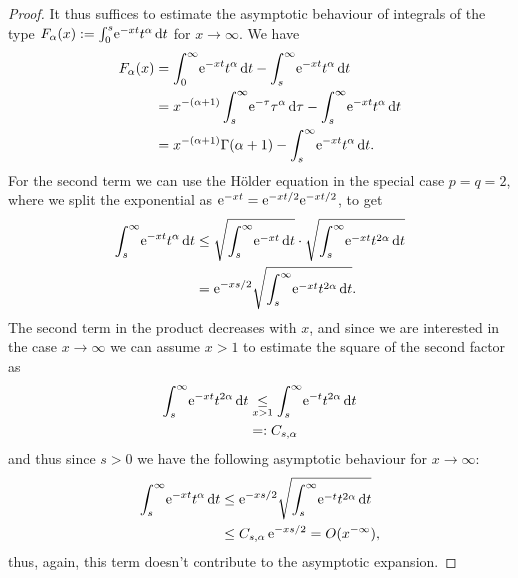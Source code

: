 \begin{theorem}
\begin{proof}
        It thus suffices to estimate the asymptotic behaviour of integrals of
        the type $F_\alpha(x) := \Integ[s]0t{\Eto{-xt}t^\alpha}$ for
        $x\to\infty$. We have
        \begin{align*}
            F_\alpha(x) &= \Integ[\infty]{0}{t}{\Eto{-xt}t^\alpha} -
            \Integ[\infty]{s}{t}{\Eto{-xt}t^\alpha} \\
            &= x^{-(\alpha+1)}\Integ[\infty]{s}{\tau}{\Eto{-\tau}\tau^\alpha} -
            \Integ[\infty]{s}{t}{\Eto{-xt}t^\alpha} \\
            &= x^{-(\alpha+1)}\Gamma(\alpha + 1) - 
            \Integ[\infty]{s}{t}{\Eto{-xt}t^\alpha}.
        \end{align*}
        For the second term we can use the Hölder equation in the special case
        $p=q=2$, where we split the exponential as $\Eto{-xt} =
        \Eto{-xt/2}\Eto{-xt/2}$, to get
        \begin{align*}
            \Integ[\infty]{s}{t}{\Eto{-xt}t^\alpha} &\le
            \sqrt{\Integ[\infty]{s}{t}{\Eto{-xt}}} \cdot
            \sqrt{\Integ[\infty]{s}{t}{\Eto{-xt}t^{2\alpha}}} \\
            &= \Eto{-xs/2} \sqrt{\Integ[\infty]{s}{t}{\Eto{-xt}t^{2\alpha}}}.
        \end{align*}
        The second term in the product decreases with $x$, and since we are
        interested in the case $x\to\infty$ we can assume $x>1$ to estimate the
        square of the second factor as
        \begin{align*}
            \Integ[\infty]{s}{t}{\Eto{-xt}t^{2\alpha}} &\underset{x>1}\le
            \Integ[\infty]{s}{t}{\Eto{-t}t^{2\alpha}} \\
            &=: C_{s,\alpha}
        \end{align*}
        and thus since $s>0$ we have the following asymptotic behaviour for
        $x\to\infty$:
        \begin{align*}
            \Integ[\infty]{s}{t}{\Eto{-xt}t^\alpha} &\le \Eto{-xs/2}
            \sqrt{\Integ[\infty]{s}{t}{\Eto{-t}t^{2\alpha}}} \\
            &\le C_{s,\alpha}\,\Eto{-xs/2} = O(x^{-\infty}),
        \end{align*}
        thus, again, this term doesn't contribute to the asymptotic expansion.


\end{proof}
\end{theorem}
